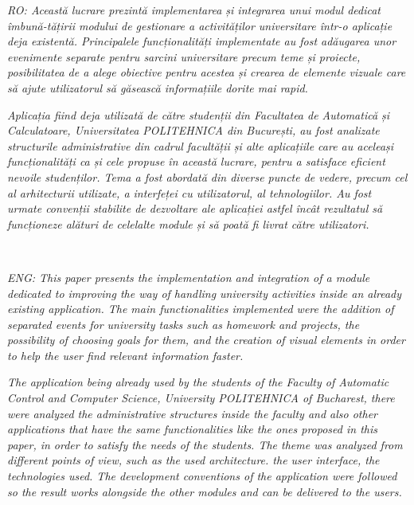 \vspace*{\fill}
\noindent


\textit{RO: Această lucrare prezintă implementarea și integrarea unui modul dedicat îmbună-tățirii modului de gestionare a activităților universitare într-o aplicație deja existentă.
Principalele funcționalități implementate au fost adăugarea unor evenimente separate pentru sarcini universitare precum teme și proiecte, posibilitatea de a alege obiective pentru acestea și crearea de elemente vizuale care să ajute utilizatorul să găsească informațiile dorite mai rapid.}

\textit{Aplicația fiind deja utilizată de către studenții din Facultatea de Automatică și Calculatoare, Universitatea POLITEHNICA din București, au fost analizate structurile administrative din cadrul facultății și alte aplicațiile care au aceleași funcționalități ca și cele propuse în această lucrare, pentru a satisface eficient nevoile studenților. Tema a fost abordată din diverse puncte de vedere, precum cel al arhitecturii utilizate, a interfeței cu utilizatorul, al tehnologiilor.  
Au fost urmate convenții stabilite de dezvoltare ale aplicației astfel încât rezultatul să funcționeze alături de celelalte module și să poată fi livrat către utilizatori.}

~

\textit{ENG: This paper presents the implementation and integration of a module dedicated to improving the way of handling university activities inside an already existing application.
The main functionalities implemented were the addition of separated events for university tasks such as homework and projects, the possibility of choosing goals for them, and the creation of visual elements in order to help the user find relevant information faster.}

\textit{The application being already used by the students of the Faculty of Automatic Control and Computer Science, University POLITEHNICA of Bucharest, there were analyzed the administrative structures inside the faculty and also other applications that have the same functionalities like the ones proposed in this paper, in order to satisfy the needs of the students.
The theme was analyzed from different points of view, such as the used architecture. the user interface, the technologies used.
The development conventions of the application were followed so the result works alongside the other modules and can be delivered to the users.}

\vspace*{\fill}